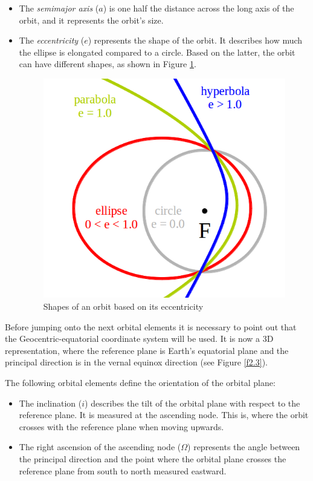 \begin{itemize}
\item The \emph{semimajor axis} ($a$) is one half the distance across the long axis of the orbit, and it represents the orbit's size.
\item The \emph{eccentricity} ($e$) represents the shape of the orbit. It describes how much the ellipse is elongated compared to a circle. Based on the latter, the orbit can have different shapes, as shown in Figure \ref{f2.2}.

\begin{figure}[H]
\centerline{\includegraphics[scale=0.35]{images/Eccentricity.png}}
\caption{Shapes of an orbit based on its eccentricity}
\label{f2.2}
\end{figure}

\end{itemize}


Before jumping onto the next orbital elements it is necessary to point out that the Geocentric-equatorial coordinate system will be used. It is now a 3D representation, where the reference plane is Earth's equatorial plane and the principal direction is in the vernal equinox direction (see Figure \ref{f2.3}).

The following orbital elements define the orientation of the orbital plane:

\begin{itemize}
\item The inclination ($i$) describes the tilt of the orbital plane with respect to the reference plane. It is measured at the ascending node. This is, where the orbit crosses with the reference plane when moving upwards.
\item The right ascension of the ascending node ($\Omega$) represents the angle between the principal direction and the point where the orbital plane crosses the reference plane from south to north measured eastward. 
\end{itemize}


